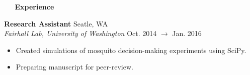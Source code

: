 \documentclass[a4paper,12pt]{article}
\newcommand{\resheading}[1]{{\vspace*{.06in} \colorbox{mygrey}{\begin{minipage}{\textwidth}{\textmd{\large \textbf{#1} \vphantom{p\^{E}}}}\end{minipage}}} }
\newcommand{\ressubheading}[4]{
        \textbf{#1} \hfill #2\\
        \textit{#3} \hfill #4 \\}
\begin{document}
%
%    
%    
%    
\resheading{~\faBriefcase~ Experience}


\ressubheading{Research Assistant}{Seatle, WA}{Fairhall Lab, University of Washington}{Oct. 2014 $\rightarrow$ Jan. 2016}
\begin{itemize}[noitemsep,topsep=0pt,parsep=0pt,partopsep=0pt, nolistsep]
\item Created simulations of mosquito decision-making experiments using SciPy.
\item Preparing manuscript for peer-review.
\end{itemize}



        
    
 
\end{document}
